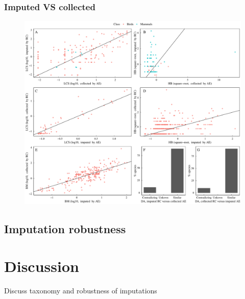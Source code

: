 \subsubsection{Imputed VS collected}
\begin{figure}[h!]
\centering
\includegraphics[scale=0.5]{figures/chapter2/Comparison_with_RCooke/Comparison_imputed_VS_collected.pdf}
\caption[]{}
\label{ComparisonRC_VS}
\end{figure}


\subsection{Imputation robustness}



\section{Discussion}
Discuss taxonomy and robustness of imputations

